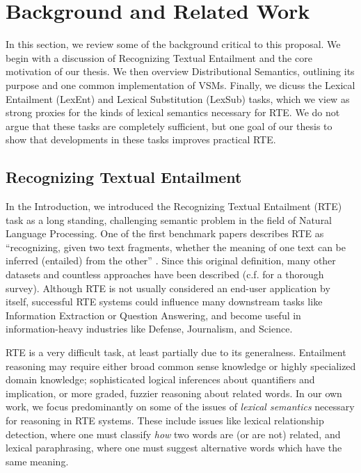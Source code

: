 \documentclass[12pt]{article}
\begin{document}
\section{Background and Related Work}
\label{sec:background}

In this section, we review some of the background critical to this proposal.
We begin with a discussion of Recognizing Textual Entailment and the core
motivation of our thesis.  We then overview Distributional Semantics, outlining
its purpose and one common implementation of VSMs. Finally, we dicuss the
Lexical Entailment (LexEnt) and Lexical Substitution (LexSub) tasks, which we
view as strong proxies for the kinds of lexical semantics necessary for RTE. We
do not argue that these tasks are completely sufficient, but one goal of our
thesis to show that developments in these tasks improves practical RTE.

\subsection{Recognizing Textual Entailment}
\label{sec:textent}

In the Introduction, we introduced the Recognizing Textual Entailment (RTE)
task as a long standing, challenging semantic problem in the field of
Natural Language Processing.  One of the first benchmark papers describes RTE
as ``recognizing, given two text fragments, whether the meaning of one text can
be inferred (entailed) from the other'' \cite{dagan:2006:mlc}. Since this
original definition, many other datasets
\cite{giampiccolo:2007:pascal,bentivogli:2009:tac,marelli:2014:semeval} and
countless approaches have been described (c.f. 
for a thorough survey). Although RTE is not usually considered an
end-user application by itself, successful RTE systems could influence many
downstream tasks like Information Extraction or Question Answering, and become
useful in information-heavy industries like Defense, Journalism, and Science.

RTE is a very difficult task, at least partially due to its generalness.
Entailment reasoning may require either broad common sense knowledge or highly
specialized domain knowledge; sophisticated logical inferences
about quantifiers and implication, or more graded, fuzzier reasoning about
related words. In our own work, we focus predominantly on some of the issues
of {\em lexical semantics} necessary for reasoning in RTE systems. These
include issues like lexical relationship detection, where one must classify
{\em how} two words are (or are not) related, and lexical paraphrasing, where
one must suggest alternative words which have the same meaning.
\end{document}
